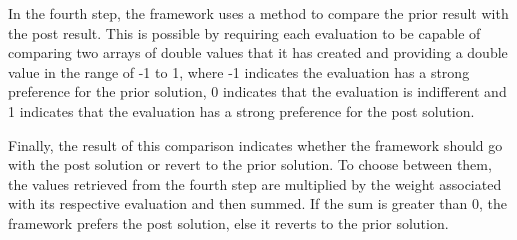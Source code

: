 In the fourth step, the framework uses a method to compare the prior result with the post result. This is possible by requiring each evaluation to be capable of comparing two arrays of double values that it has created and providing a double value in the range of -1 to 1, where -1 indicates the evaluation has a strong preference for the prior solution, 0 indicates that the evaluation is indifferent and 1 indicates that the evaluation has a strong preference for the post solution.

Finally, the result of this comparison indicates whether the framework should go with the post solution or revert to the prior solution. To choose between them, the values retrieved from the fourth step are multiplied by the weight associated with its respective evaluation and then summed. If the sum is greater than 0, the framework prefers the post solution, else it reverts to the prior solution. 